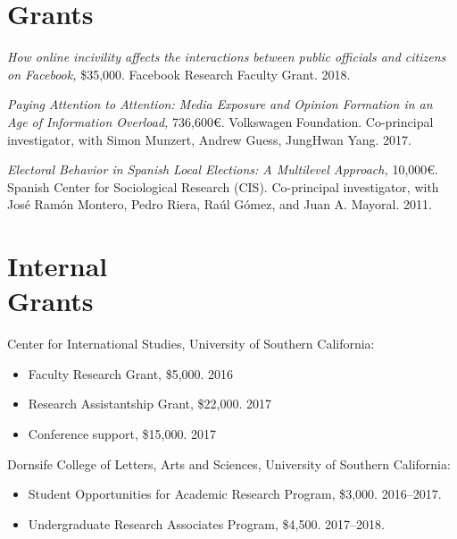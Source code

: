 \documentclass[margin,line,11pt]{resume}
\begin{document}
\begin{resume}

        \section{\mysidestyle Grants}
        
\textit{How online incivility affects the interactions between public officials and citizens on Facebook,} \$35,000. Facebook Research Faculty Grant. 2018.        
        
\textit{Paying Attention to Attention: Media Exposure and Opinion Formation in an Age of Information Overload,} 736,600\euro. Volkswagen Foundation. Co-principal investigator, with Simon Munzert, Andrew Guess, JungHwan Yang. 2017.

    \textit{Electoral Behavior in Spanish Local Elections: A Multilevel Approach,} 10,000\euro. Spanish Center for Sociological Research (CIS). Co-principal investigator, with Jos\'{e} Ram\'{o}n Montero, Pedro Riera, Ra\'{u}l G\'{o}mez, and Juan A. Mayoral. 2011.    

  

        \section{\mysidestyle Internal\\Grants}

Center for International Studies, University of Southern California:
\begin{itemize}
\item[] Faculty Research Grant, \$5,000. 2016
\vspace{-.15cm}
\item[] Research Assistantship Grant, \$22,000. 2017
\vspace{-.15cm}
\item[] Conference support, \$15,000. 2017
\end{itemize}
Dornsife College of Letters, Arts and Sciences, University of Southern California:
\begin{itemize}
\item[] Student Opportunities for Academic Research Program, \$3,000. 2016--2017.
\vspace{-.15cm}
\item[] Undergraduate Research Associates Program, \$4,500. 2017--2018.
\end{itemize}
 

\end{resume}
\end{document}
